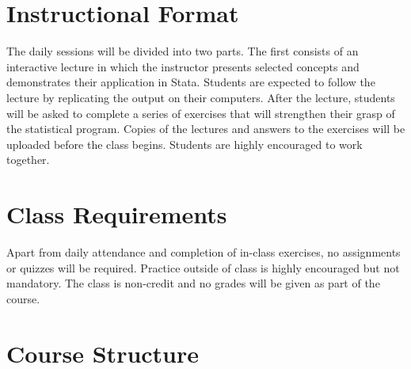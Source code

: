 \documentclass[11pt]{article}
\begin{document}

\section*{Instructional Format}

The daily sessions will be divided into two parts. The first consists of an interactive lecture in which the instructor presents selected concepts and demonstrates their application in Stata. Students are expected to follow the lecture by replicating the output on their computers. After the lecture,  students will be asked to complete a series of exercises that will strengthen their grasp of the statistical program. Copies of the lectures and answers to the exercises will be uploaded before the class begins. Students are highly encouraged to work together. 


\section*{Class Requirements}
Apart from daily attendance and completion of in-class exercises, no assignments or quizzes will be required. Practice outside of class is highly encouraged but not mandatory. The class is non-credit and no grades will be given as part of the course.     




\section*{Course Structure}
\end{document}
